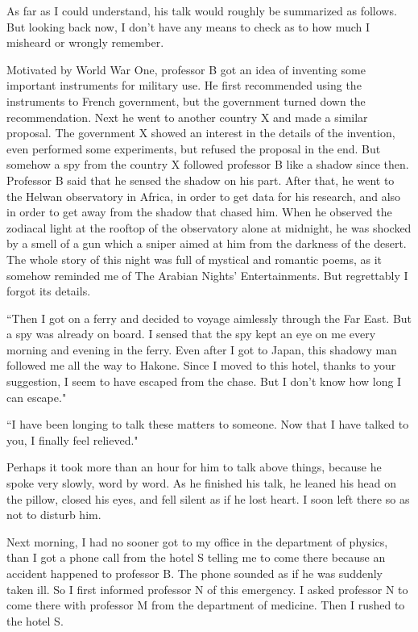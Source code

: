\documentclass[11pt,a4j,twocolumn]{jarticle}
\begin{document}
As far as I could understand, his talk would roughly be 
summarized as follows. But looking back now, I don't have
any means to check as to how much I misheard or wrongly remember.

Motivated by World War One, professor B got an idea
of inventing some important instruments for military use.
He first recommended using the instruments to French government,
but the government turned down the recommendation.
Next he went to another country X and made a similar proposal.
The government X showed an interest in the details of the invention,
even performed some experiments, but refused the proposal in the end.
But somehow a spy from the country X followed professor B 
like a shadow since then. 
Professor B said that he sensed the shadow on his part.
After that, he went to the Helwan observatory in Africa,
in order to get data for his research, and also
in order to get away from the shadow that chased him.
When he observed the zodiacal light at the rooftop 
of the observatory alone at midnight,
he was shocked by a smell of a gun which
a sniper aimed at him from the darkness of the desert.
The whole story of this night was full of mystical and romantic poems,
as it somehow reminded me of The Arabian Nights' Entertainments.
But regrettably I forgot its details.

``Then I got on a ferry and decided to voyage aimlessly 
through the Far East. But a spy was already on board.
I sensed that the spy kept an eye on me every morning and evening in the ferry.
Even after I got to Japan, this shadowy man followed me
all the way to Hakone. Since I moved to this hotel,
thanks to your suggestion, I seem to have escaped from the chase.
But I don't know how long I can escape."

``I have been longing to talk these matters to someone.
Now that I have talked to you, I finally feel relieved."

Perhaps it took more than an hour for him to talk above things,
because he spoke very slowly, word by word.
As he finished his talk, he leaned his head on the pillow,
closed his eyes, and fell silent as if he lost heart.
I soon left there so as not to disturb him.

Next morning, I had no sooner got to my office
in the department of physics, than I got a phone call
from the hotel S telling me to come there because 
an accident happened to professor B.
The phone sounded as if he was suddenly taken ill.
So I first informed professor N of this emergency.
I asked professor N to come there with professor M 
from the department of medicine. Then I rushed to the hotel S.
\end{document}
